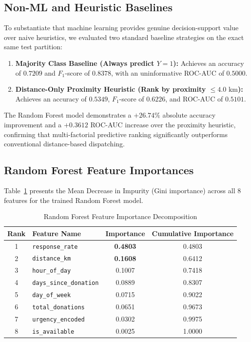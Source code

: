 \documentclass[conference]{IEEEtran}
\begin{document}
\subsection{Non-ML and Heuristic Baselines}
To substantiate that machine learning provides genuine decision-support value over naive heuristics, we evaluated two standard baseline strategies on the exact same test partition:
\begin{enumerate}
    \item \textbf{Majority Class Baseline (Always predict $Y=1$):} Achieves an accuracy of $0.7209$ and $F_1$-score of $0.8378$, with an uninformative ROC-AUC of $0.5000$.
    \item \textbf{Distance-Only Proximity Heuristic (Rank by proximity $\le 4.0\text{ km}$):} Achieves an accuracy of $0.5349$, $F_1$-score of $0.6226$, and ROC-AUC of $\mathbf{0.5101}$.
\end{enumerate}
The Random Forest model demonstrates a $\mathbf{+26.74\%}$ absolute accuracy improvement and a $\mathbf{+0.3612}$ ROC-AUC increase over the proximity heuristic, confirming that multi-factorial predictive ranking significantly outperforms conventional distance-based dispatching.

\subsection{Random Forest Feature Importances}
Table~\ref{tab:feature_importances} presents the Mean Decrease in Impurity (Gini importance) across all 8 features for the trained Random Forest model.

\begin{table}[H]
\caption{Random Forest Feature Importance Decomposition}
\label{tab:feature_importances}
\centering
\begin{tabular}{clcc}
\toprule
\textbf{Rank} & \textbf{Feature Name} & \textbf{Importance} & \textbf{Cumulative Importance} \\
\midrule
1 & \texttt{response\_rate} & \textbf{0.4803} & 0.4803 \\
2 & \texttt{distance\_km} & \textbf{0.1608} & 0.6412 \\
3 & \texttt{hour\_of\_day} & 0.1007 & 0.7418 \\
4 & \texttt{days\_since\_donation} & 0.0889 & 0.8307 \\
5 & \texttt{day\_of\_week} & 0.0715 & 0.9022 \\
6 & \texttt{total\_donations} & 0.0651 & 0.9673 \\
7 & \texttt{urgency\_encoded} & 0.0302 & 0.9975 \\
8 & \texttt{is\_available} & 0.0025 & 1.0000 \\
\bottomrule
\end{tabular}
\end{table}
\end{document}
